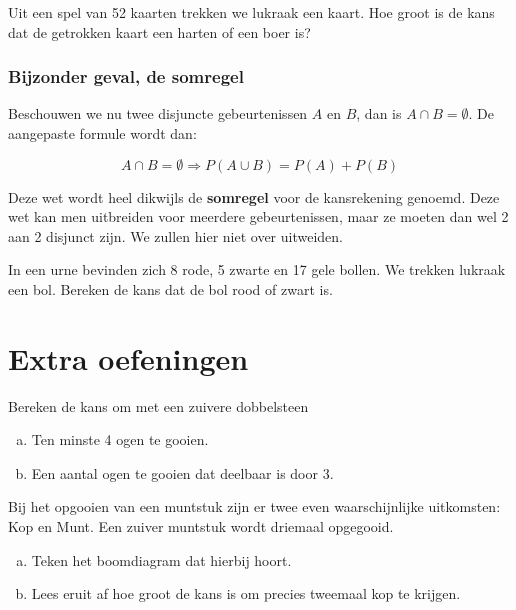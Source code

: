 \documentclass[12pt,twoside]{article}
\begin{document}
\begin{oefening}
Uit een spel van 52 kaarten trekken we lukraak een kaart. Hoe groot is de kans dat de
getrokken kaart een harten of een boer is?
\end{oefening}

\subsubsection{Bijzonder geval, de somregel}
Beschouwen we nu twee disjuncte gebeurtenissen $A$ en $B$, dan is $A \cap B = \emptyset$.
De aangepaste formule wordt dan:\\
\begin{mdframed}
$$A \cap B = \emptyset \Rightarrow P(A\cup B)=P(A)+P(B)$$
\end{mdframed}
Deze wet wordt heel dikwijls de {\bf somregel} voor de kansrekening genoemd. Deze wet
kan men uitbreiden voor meerdere gebeurtenissen, maar ze moeten dan wel 2 aan 2
disjunct zijn. We zullen hier niet over uitweiden.

\begin{oefening}
In een urne bevinden zich 8 rode, 5 zwarte en 17 gele bollen. We trekken lukraak een
bol. Bereken de kans dat de bol rood of zwart is.
\end{oefening}

\cleardoublepage
\section{Extra oefeningen}

\begin{oefening}
Bereken de kans om met een zuivere dobbelsteen
\begin{enumerate}[(a)]
  \item Ten minste 4 ogen te gooien.
  \item Een aantal ogen te gooien dat deelbaar is door 3.
\end{enumerate}
\end{oefening}

\begin{oefening}
Bij het opgooien van een muntstuk zijn er twee even waarschijnlijke uitkomsten: Kop en Munt. Een zuiver muntstuk wordt driemaal opgegooid.
\begin{enumerate}[(a)]
  \item Teken het boomdiagram dat hierbij hoort.
  \item Lees eruit af hoe groot de kans is om precies tweemaal kop te krijgen.
\end{enumerate}
\end{oefening}
\end{document}
